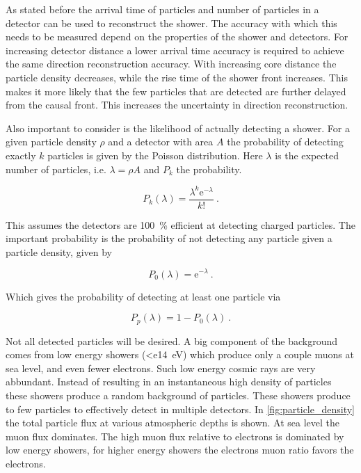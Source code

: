 As stated before the arrival time of particles and number of particles in a detector can be used to reconstruct the shower. The accuracy with which this needs to be measured depend on the properties of the shower and detectors. For increasing detector distance a lower arrival time accuracy is required to achieve the same direction reconstruction accuracy. With increasing core distance the particle density decreases, while the rise time of the shower front increases. This makes it more likely that the few particles that are detected are further delayed from the causal front. This increases the uncertainty in direction reconstruction.

Also important to consider is the likelihood of actually detecting a shower. For a given particle density $\rho$ and a detector with area $A$ the probability of detecting exactly $k$ particles is given by the Poisson distribution. Here $\lambda$ is the expected number of particles, i.e. $\lambda = \rho A$ and $P_k$ the probability.

\begin{equation}
    P_k(\lambda) = \frac{\lambda^k \mathrm{e}^{-\lambda}}{k!} \ .
\end{equation}

This assumes the detectors are \SI{100}{\percent} efficient at detecting charged particles. The important probability is the probability of not detecting any particle given a particle density, given by

\begin{equation}
    P_0(\lambda) = \mathrm{e}^{-\lambda} \ .
\end{equation}

Which gives the probability of detecting at least one particle via

\begin{equation}
    P_p(\lambda) = 1-P_0(\lambda) \ .
\end{equation}

Not all detected particles will be desired. A big component of the background comes from low energy showers (\SI{<e14}{\eV}) which produce only a couple muons at sea level, and even fewer electrons. Such low energy cosmic rays are very abbundant. Instead of resulting in an instantaneous high density of particles these showers produce a random background of particles. These showers produce to few particles to effectively detect in multiple detectors. In \cref{fig:particle_density} the total particle flux at various atmospheric depths is shown. At sea level the muon flux dominates. The high muon flux relative to electrons is dominated by low energy showers, for higher energy showers the electrons muon ratio favors the electrons.

